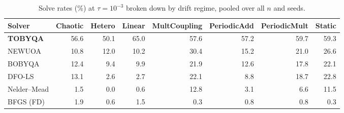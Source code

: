 \begin{table}[t]
\centering\small
\caption{Solve rates (\%) at $\tau=10^{-3}$ broken down by drift regime, pooled over all $n$ and seeds.}
\label{tab:env-breakdown}
\begin{tabular}{lrrrrrrr}
\toprule
Solver & Chaotic & Hetero & Linear & MultCoupling & PeriodicAdd & PeriodicMult & Static \\
\midrule
\textbf{TOBYQA} & 56.6 & 50.1 & 65.0 & 57.6 & 57.2 & 59.7 & 59.3 \\
NEWUOA & 10.8 & 12.0 & 10.2 & 30.4 & 15.2 & 21.0 & 26.6 \\
BOBYQA & 12.4 & 9.4 & 9.9 & 21.9 & 12.6 & 17.8 & 22.1 \\
DFO-LS & 13.1 & 2.6 & 2.7 & 22.1 & 8.8 & 18.7 & 22.8 \\
Nelder--Mead & 1.5 & 0.0 & 0.6 & 12.8 & 3.1 & 6.6 & 11.5 \\
BFGS (FD) & 1.9 & 0.6 & 1.5 & 0.3 & 0.8 & 0.8 & 0.3 \\
\bottomrule
\end{tabular}
\end{table}